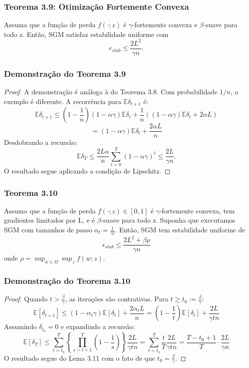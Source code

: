 \documentclass{beamer}
\newcommand{\EE}{\mathbb{E}}
\begin{document}
\begin{frame}
\frametitle{Teorema 3.9: Otimização Fortemente Convexa}
\begin{theorem}[3.9]
Assuma que a função de perda \(f(\cdot;z)\) é \(\gamma\)-fortemente convexa e \(\beta\)-suave para todo z.  Então, SGM satisfaz estabilidade uniforme com
$$ \epsilon_{stab} \le \frac{2L^2}{\gamma n}. $$ 
\end{theorem}
\end{frame}

\begin{frame}
\frametitle{Demonstração do Teorema 3.9}
\begin{proof}
A demonstração é análoga à do Teorema 3.8.  Com probabilidade \(1/n\), o exemplo é diferente. A recorrência para \(\EE\delta_{t+1}\) é:
$$ \EE\delta_{t+1} \le (1-\frac{1}{n})(1-\alpha\gamma)\EE\delta_{t} + \frac{1}{n}((1-\alpha\gamma)\EE\delta_{t} + 2\alpha L) $$ 
$$ = (1-\alpha\gamma)\EE\delta_{t} + \frac{2\alpha L}{n} $$ 
Desdobrando a recursão:
$$ \EE\delta_{T} \le \frac{2L\alpha}{n}\sum_{t=0}^{T}(1-\alpha\gamma)^{t} \le \frac{2L}{\gamma n}. $$ 
O resultado segue aplicando a condição de Lipschitz. 
\end{proof}
\end{frame}

\begin{frame}
\frametitle{Teorema 3.10}
\begin{theorem}
Assuma que a função de perda \(f(\cdot;z) \in [0,1]\) é \(\gamma\)-fortemente convexa, tem gradientes limitados por L, e é \(\beta\)-suave para todo z.  Suponha que executamos SGM com tamanhos de passo \(\alpha_{t} = \frac{1}{\gamma t}\). Então, SGM tem estabilidade uniforme de
$$ \epsilon_{stab} \le \frac{2L^2 + \beta\rho}{\gamma n} $$
onde \(\rho = \sup_{w\in\Omega}\sup_{z}f(w;z)\). 
\end{theorem}
\end{frame}

\begin{frame}
\frametitle{Demonstração do Teorema 3.10}
\begin{proof}
Quando \(t > \frac{\beta}{\gamma}\), as iterações são contrativas. Para \(t \ge t_0 := \frac{\beta}{\gamma}\):
$$ \EE[\delta_{t+1}] \le (1-\alpha_t\gamma)\EE[\delta_t] + \frac{2\alpha_t L}{n} = (1-\frac{1}{t})\EE[\delta_t] + \frac{2L}{\gamma tn} $$ 
Assumindo \(\delta_{t_0}=0\) e expandindo a recursão:
$$ \EE[\delta_T] \le \sum_{t=t_0}^{T} \left\{ \prod_{s=t+1}^{T} (1-\frac{1}{s}) \right\} \frac{2L}{\gamma tn} = \sum_{t=t_0}^{T} \frac{t}{T} \frac{2L}{\gamma tn} = \frac{T-t_0+1}{T} \cdot \frac{2L}{\gamma n} $$
O resultado segue do Lema 3.11 com o fato de que \(t_0 = \frac{\beta}{\gamma}\).
\end{proof}
\end{frame}
\end{document}
